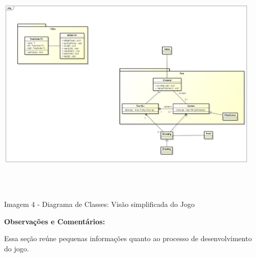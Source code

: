 \documentclass[a4paper]{article}
\begin{document}
\begin{center}
\includegraphics[width=4.9839in,height=4.3283in]{UFSCar20Summer20Tour-img/UFSCar20Summer20Tour-img5.jpg}
\end{center}

\bigskip

{\centering\color{black}
Imagem 4 - Diagrama de Classes: Visão simplificada do Jogo
\par}


\bigskip

{\color{black}
\textbf{Observações e Comentários:}}

{\color{black}
Essa seção reúne pequenas informações quanto ao processo de
desenvolvimento do jogo.}
\end{document}
